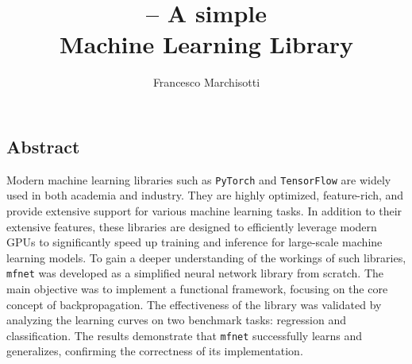 \documentclass{unitothesis}
\author{Francesco Marchisotti}
\title{\centering\mfnet \sc-- A simple\\[0.5em] Machine Learning Library}
\newcommand{\mono}[1]{\texttt{#1}}
\newcommand{\mfnet}{\mono{mfnet}\xspace}
\newcommand{\pytorch}{\mono{PyTorch}\xspace}
\begin{document}
\maketitlepage
\thispagestyle{empty}
\subsection*{\centering Abstract}
{\color{MidnightBlue}Modern machine learning libraries such as \pytorch and \mono{TensorFlow} are widely used in both academia and industry.} {\color{RoyalBlue}They are highly optimized, feature-rich, and provide extensive support for various machine learning tasks.} {\color{OliveGreen}In addition to their extensive features, these libraries are designed to efficiently leverage modern GPUs to significantly speed up training and inference for large-scale machine learning models.} To gain a deeper understanding of the workings of such libraries, \mfnet was developed as a simplified neural network library from scratch. The main objective was to implement a functional framework, focusing on the core concept of backpropagation. The effectiveness of the library was validated by analyzing the learning curves on two benchmark tasks: regression and classification. The results demonstrate that \mfnet successfully learns and generalizes, confirming the correctness of its implementation.

\newpage


{\hypersetup{linkcolor=black}\tableofcontents}





\appendix

\end{document}
